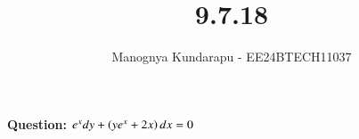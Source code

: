 \documentclass[journal]{IEEEtran}
\begin{document}

\vspace{3cm}

\title{9.7.18}
\author{Manognya Kundarapu - EE24BTECH11037
}
{\let\newpage\relax\maketitle}

\renewcommand{\thefigure}{\theenumi}
\renewcommand{\thetable}{\theenumi}
\setlength{\intextsep}{10pt} %


\renewcommand{\thetable}{\theenumi}
\textbf{Question:} $e^x dy+\left(ye^x+2x\right)dx=0$\\
\end{document}
